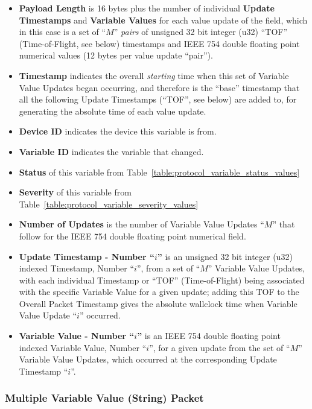 \begin{itemize}
\item{\bf Payload Length} is 16 bytes plus the number
of individual {\bf Update Timestamps} and {\bf Variable Values}
for each value update of the field,
which in this case is a set of ``$M$'' {\it pairs} of
unsigned 32 bit integer (u32) ``TOF'' (Time-of-Flight, see below)
timestamps
and IEEE 754 double floating point numerical values
(12 bytes per value update ``pair'').
\item{\bf Timestamp} indicates the overall {\it starting} time when
this set of Variable Value Updates began occurring,
and therefore is the ``base'' timestamp that
all the following Update Timestamps (``TOF'', see below)
are added to, for generating the absolute time of each value update.
\item{\bf Device ID} indicates the device this variable is from.
\item{\bf Variable ID} indicates the variable that changed.
\item{\bf Status} of this variable from
Table~\ref{table:protocol_variable_status_values}
\item{\bf Severity} of this variable from
Table~\ref{table:protocol_variable_severity_values}
\item{\bf Number of Updates}
is the number of Variable Value Updates ``$M$''
that follow for the IEEE 754 double floating point numerical field.
\item{\bf Update Timestamp - Number ``$i$''} is an
unsigned 32 bit integer (u32) indexed Timestamp, Number ``$i$'',
from a set of ``$M$'' Variable Value Updates,
with each individual Timestamp or ``TOF'' (Time-of-Flight)
being associated with the specific Variable Value for a given update;
adding this TOF to the Overall Packet Timestamp gives the
absolute wallclock time when Variable Value Update ``$i$'' occurred.
\item{\bf Variable Value - Number ``$i$''} is an
IEEE 754 double floating point indexed Variable Value, Number ``$i$'',
for a given update from the set of ``$M$'' Variable Value Updates,
which occurred at the corresponding Update Timestamp ``$i$''.
\end{itemize}


\newpage
\subsubsection{Multiple Variable Value (String) Packet}
\label{section:protocol_mult_variable_value_string}

